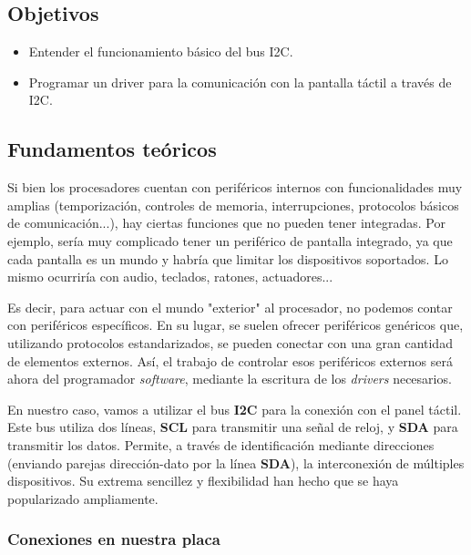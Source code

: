 \documentclass[../main.tex]{subfiles}
\begin{document}

    \subsection{Objetivos}
        \begin{itemize}
            \item Entender el funcionamiento básico del bus I2C.
            \item Programar un driver para la comunicación con la pantalla táctil a través de I2C.
        \end{itemize}

    \subsection{Fundamentos teóricos}
        
        Si bien los procesadores cuentan con periféricos internos con funcionalidades muy amplias (temporización, controles de memoria, interrupciones, protocolos básicos de comunicación...), hay ciertas funciones que no pueden tener integradas. Por ejemplo, sería muy complicado tener un periférico de pantalla integrado, ya que cada pantalla es un mundo y habría que limitar los dispositivos soportados. Lo mismo ocurriría con audio, teclados, ratones, actuadores...

        Es decir, para actuar con el mundo "exterior" al procesador, no podemos contar con periféricos específicos. En su lugar, se suelen ofrecer periféricos genéricos que, utilizando protocolos estandarizados, se pueden conectar con una gran cantidad de elementos externos. Así, el trabajo de controlar esos periféricos externos será ahora del programador \emph{software}, mediante la escritura de los \emph{drivers} necesarios.

        En nuestro caso, vamos a utilizar el bus \textbf{I2C} para la conexión con el panel táctil. Este bus utiliza dos líneas, \textbf{SCL} para transmitir una señal de reloj, y \textbf{SDA} para transmitir los datos. Permite, a través de identificación mediante direcciones (enviando parejas dirección-dato por la línea \textbf{SDA}), la interconexión de múltiples dispositivos. Su extrema sencillez y flexibilidad han hecho que se haya popularizado ampliamente.

        \subsubsection{Conexiones en nuestra placa}
\end{document}
